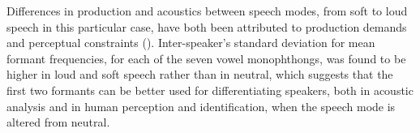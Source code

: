 \documentclass[12pt,a4paper]{article}
\begin{document}
Differences in production and acoustics between speech modes, from soft to loud speech in this particular case, have both been attributed to production demands and perceptual constraints (\citealt{Schulman-1989}). Inter-speaker’s standard deviation for mean formant frequencies, for each of the seven vowel monophthongs, was found to be higher in loud and soft speech rather than in neutral, which suggests that the first two formants can be better used for differentiating speakers, both in acoustic analysis and in human perception and identification, when the speech mode is altered from neutral.

\renewcommand\bibname{References} %
\end{document}
